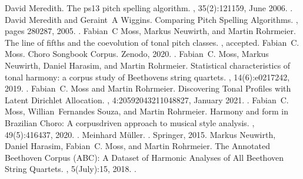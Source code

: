 \documentclass[letterpaper,10pt,english]{sphinxmanual}
\begin{document}
\begin{sphinxthebibliography}{10}
\sphinxAtStartPar
David Meredith. The ps13 pitch spelling algorithm. , 35(2):121\textendash{}159, June 2006. .
\sphinxAtStartPar
David Meredith and Geraint A Wiggins. Comparing Pitch Spelling Algorithms. , pages 280\textendash{}287, 2005. .
\sphinxAtStartPar
Fabian C Moss, Markus Neuwirth, and Martin Rohrmeier. The line of fifths and the co\sphinxhyphen{}evolution of tonal pitch classes. , accepted.
\sphinxAtStartPar
Fabian C. Moss. Choro Songbook Corpus. Zenodo, 2020. .
\sphinxAtStartPar
Fabian C. Moss, Markus Neuwirth, Daniel Harasim, and Martin Rohrmeier. Statistical characteristics of tonal harmony: a corpus study of Beethoven\textquotesingle{}s string quartets. , 14(6):e0217242, 2019. .
\sphinxAtStartPar
Fabian C. Moss and Martin Rohrmeier. Discovering Tonal Profiles with Latent Dirichlet Allocation. , 4:20592043211048827, January 2021. .
\sphinxAtStartPar
Fabian C. Moss, Willian Fernandes Souza, and Martin Rohrmeier. Harmony and form in Brazilian Choro: A corpus\sphinxhyphen{}driven approach to musical style analysis. , 49(5):416\textendash{}437, 2020. .
\sphinxAtStartPar
Meinhard Müller. . Springer, 2015.
\sphinxAtStartPar
Markus Neuwirth, Daniel Harasim, Fabian C. Moss, and Martin Rohrmeier. The Annotated Beethoven Corpus (ABC): A Dataset of Harmonic Analyses of All Beethoven String Quartets. , 5(July):1\textendash{}5, 2018. .

\end{sphinxthebibliography}
\end{document}
